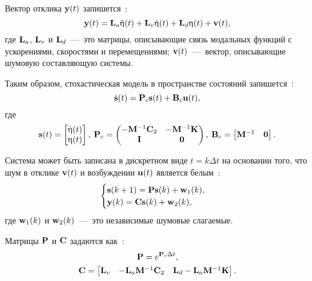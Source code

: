 Вектор отклика $ \mathbf{y}(t) $ запишется~\cite{lib:oma:Nilsson}:
\begin{equation}
	\mathbf{y}(t) = \mathbf{L}_a \ddot{\mathbf{\upeta}}(t) + \mathbf{L}_v \dot{\mathbf{\upeta}}(t) + \mathbf{L}_d \upeta(t) + \mathbf{v}(t),
\end{equation}
где $ \mathbf{L}_a $, $ \mathbf{L}_v $ и $ \mathbf{L}_d $~---~это матрицы, описывающие связь модальных функций с ускорениями, скоростями и перемещениями; $ \mathbf{v}(t) $~---~вектор, описывающие шумовую составляющую системы. 

Таким образом, стохастическая модель в пространстве состояний запишется~\cite{lib:oma:Juang}:
\begin{equation}
	\dot{\mathbf{s}}(t) = \mathbf{P}_c \mathbf{s}(t) + \mathbf{B}_c \mathbf{u}(t), \label{eq:stochasticModelSSI}
\end{equation}
где 
\begin{equation}
	\begin{gathered}
		\mathbf{s}(t) = 
		\begin{bmatrix} 
			\dot{\mathbf{\upeta}}(t) \\ 
			\mathbf{\upeta}(t) 
		\end{bmatrix}, \:
		\mathbf{P}_c =
		\begin{pmatrix}
			-\mathbf{M} ^ {-1} \mathbf{C}_2 & -\mathbf{M} ^ {-1} \mathbf{K} \\
			 \mathbf{I} & \mathbf{0}
		\end{pmatrix}, \:
		\mathbf{B}_c = 
		\begin{bmatrix}
			\mathbf{M} ^ {-1} &
			\mathbf{0}	
		\end{bmatrix}.
	\end{gathered}
\end{equation}

Система может быть записана в дискретном виде $ t = k \Delta t $ на основании того, что шум в отклике $ \mathbf{v}(t) $ и возбуждении $ \mathbf{u}(t) $ является белым~\cite{lib:oma:Nilsson}:
\begin{equation}
	\begin{cases}
		\mathbf{s}(k + 1) = \mathbf{P} \mathbf{s}(k) + \mathbf{w}_1(k), \\
		\mathbf{y}(k) = \mathbf{C} \mathbf{s}(k) + \mathbf{w}_2(k),
	\end{cases}
\end{equation}
где $ \mathbf{w}_1(k) $ и $ \mathbf{w}_2(k) $~---~это независимые шумовые слагаемые. 

Матрицы $ \mathbf{P} $ и $ \mathbf{C} $ задаются как~\cite{lib:oma:Nilsson}:
\begin{gather}
	\mathbf{P} = e ^ {\mathbf{P}_c \Delta t}, \\
	\mathbf{C} = 
	\begin{bmatrix} 
		\mathbf{L}_v & -\mathbf{L}_a \mathbf{M} ^ {-1} \mathbf{C}_2 & \mathbf{L}_d - \mathbf{L}_a \mathbf{M} ^ {-1} \mathbf{K}
	\end{bmatrix}.
\end{gather}

